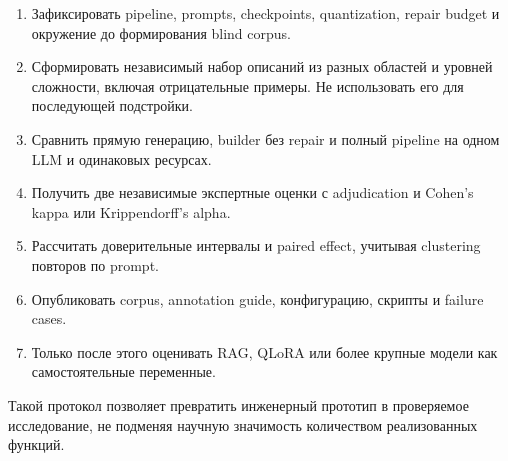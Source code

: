 \begin{enumerate}
    \item Зафиксировать pipeline, prompts, checkpoints, quantization, repair budget и окружение до формирования blind corpus.
    \item Сформировать независимый набор описаний из разных областей и уровней сложности, включая отрицательные примеры. Не использовать его для последующей подстройки.
    \item Сравнить прямую генерацию, builder без repair и полный pipeline на одном LLM и одинаковых ресурсах.
    \item Получить две независимые экспертные оценки с adjudication и Cohen's kappa или Krippendorff's alpha.
    \item Рассчитать доверительные интервалы и paired effect, учитывая clustering повторов по prompt.
    \item Опубликовать corpus, annotation guide, конфигурацию, скрипты и failure cases.
    \item Только после этого оценивать RAG, QLoRA или более крупные модели как самостоятельные переменные.
\end{enumerate}

Такой протокол позволяет превратить инженерный прототип в проверяемое исследование, не подменяя научную значимость количеством реализованных функций.
